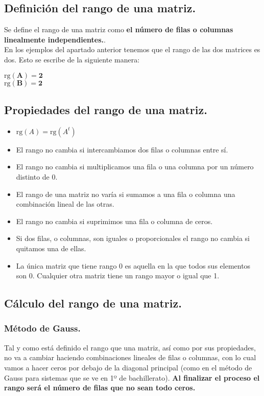 \documentclass[a4paper,11pt,answers]{exam}
\newcommand\rango[1]{\mathrm{rg}(#1)}
\begin{document}
\subsection{Definición del rango de una matriz.}
Se define el rango de una matriz como \textbf{el número de filas o columnas linealmente independientes.}.\\

En los ejemplos del apartado anterior tenemos que el rango de las dos matrices es dos. Esto se escribe de la siguiente manera:
\begin{multicols}{2}
$\boldsymbol{\rango{A} = 2}$\\$\boldsymbol{\rango{B} = 2}$
\end{multicols}
\subsection{Propiedades del rango de una matriz.}
\begin{itemize}
	\item $\rango{A} = \rango{A^t}$
	\item El rango no cambia si intercambiamos dos filas o columnas entre sí.
	\item El rango no cambia si multiplicamos una fila o una columna por un número distinto de 0.
	\item El rango de una matriz no varía si sumamos a una fila o columna una combinación lineal de las otras.
	\item El rango no cambia si suprimimos una fila o columna de ceros.
	\item Si dos filas, o columnas, son iguales o proporcionales el rango no cambia si quitamos una de ellas.
	\item La única matriz que tiene rango 0 es aquella en la que todos sus elementos son 0. Cualquier otra matriz tiene un rango mayor o igual que 1.
\end{itemize}
\subsection{Cálculo del rango de una matriz.}
\subsubsection{Método de Gauss.}
Tal y como está definido el rango que una matriz, así como por sus propiedades, no va a cambiar haciendo combinaciones lineales de filas o columnas, con lo cual vamos a hacer ceros por debajo de la diagonal principal (como en el método de Gauss para sistemas que se ve en 1º de bachillerato). \textbf{Al finalizar el proceso el rango será el número de filas que no sean todo ceros.}\\
\end{document}
